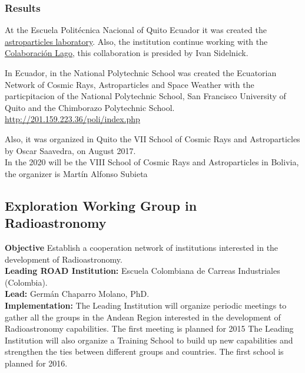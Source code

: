 \subsubsection{Results}
At the Escuela Politécnica Nacional of Quito Ecuador it was created
the \href{http://201.159.223.36/poli/index.php}{astroparticles
  laboratory}. Also, the institution continue working with the
\href{http://lagoproject.net/}{Colaboración Lago}, this collaboration
is presided by Ivan Sidelnick. %

In Ecuador, in the National Polytechnic School was created the
Ecuatorian Network of Cosmic Rays, Astroparticles and Space Weather
with the particpitacion of the National Polytechnic School, San
Francisco University of Quito and the Chimborazo Polytechnic
School. \href{Astroparticle Laboratory of the  National Polytechnic
  School}{http://201.159.223.36/poli/index.php} 

Also, it was organized in Quito the VII School of Cosmic Rays and
Astroparticles by Oscar Saavedra, on August 2017. 
\\
In the 2020 will be the VIII School of Cosmic Rays and Astroparticles
in Bolivia, the organizer is Martín Alfonso Subieta




\subsection{Exploration Working Group in Radioastronomy}
\textbf{Objective} Establish a cooperation network of institutions
interested in the development of Radioastronomy. 
\\
\textbf{Leading ROAD Institution:} Escuela Colombiana de Carreas
Industriales (Colombia). 
\\
\textbf{Lead:} Germán Chaparro Molano, PhD. 
\\
\textbf{Implementation:} The Leading Institution will organize
periodic meetings to gather all the groups in the Andean Region
interested in the development of Radioastronomy capabilities. The
first meeting is planned for 2015 The Leading Institution will also
organize a Training School to build up new capabilities and strengthen
the ties between different groups and countries. The first school is
planned for 2016. 

